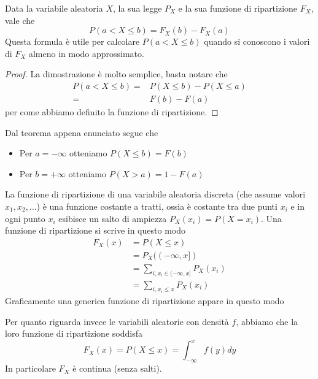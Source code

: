 \begin{theorem}
	Data la variabile aleatoria $X$, la sua legge $P_X$ e la sua funzione di ripartizione $F_X$, vale
	che
	\[ P(a < X \leq b) = F_X (b) - F_X(a) \]
	Questa formula è utile per calcolare $P(a < X \leq b)$ quando si conoscono i valori di $F_X$
	almeno in modo approssimato.
	\begin{proof}
		La dimostrazione è molto semplice, basta notare che
		\begin{align*}
			P(a < X \leq b) = & P(X \leq b) - P(X \leq a) \\
			=                 & F(b) - F(a)
		\end{align*}
		per come abbiamo definito la funzione di ripartizione.
	\end{proof}
\end{theorem}

\begin{observation}
	Dal teorema appena enunciato segue che
	\begin{itemize}
		\item Per $a = -\infty$ otteniamo $P(X \leq b) = F(b)$
		\item Per $b = +\infty$ otteniamo $P(X > a) = 1 - F(a)$
	\end{itemize}
\end{observation}

La funzione di ripartizione di una variabile aleatoria discreta (che assume valori
$x_1, x_2, \dots$) è una funzione costante a tratti, ossia è costante tra due punti $x_i$ e in ogni
punto $x_i$ esibisce un salto di ampiezza $P_X(x_i) = P(X = x_i)$. Una funzione di ripartizione
si scrive in questo modo
\begin{align*}
	F_X(x) & = P(X \leq x)                              \\
	       & = P_X ((-\infty, x])                       \\
	       & = \sum_{i, x_i \in (-\infty, x]} P_X (x_i) \\
	       & = \sum_{i, x_i \leq x} P_X (x_i)
\end{align*}
Graficamente una generica funzione di ripartizione appare in questo modo
\begin{center}
\end{center}
Per quanto riguarda invece le variabili aleatorie con densità $f$, abbiamo che la loro funzione di
ripartizione soddisfa
\[ F_X(x) = P(X \leq x) = \int_{-\infty}^x f(y) dy \]
In particolare $F_X$ è continua (senza salti).

